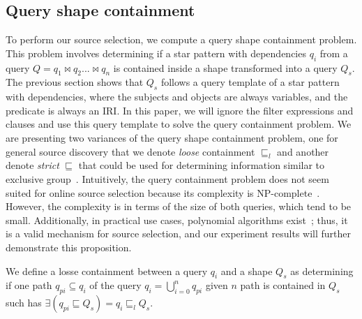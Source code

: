 \subsection{Query shape containment}

To perform our source selection, we compute a query shape containment problem. 
This problem involves determining if a star pattern with dependencies $q_i$ from a query $Q = q_1 \bowtie q_2 ... \bowtie q_n$ is contained inside a shape transformed into a query $Q_s$. 
The previous section shows that $Q_s$ follows a query template of a star pattern with dependencies, where the subjects and objects are always variables, and the predicate is always an IRI.
In this paper, we will ignore the filter expressions and clauses and use this query template to solve the query containment problem.
We are presenting two variances of the query shape containment problem, one for general source discovery that we denote \emph{loose} containment $\sqsubseteq_l$ and 
another denote \emph{strict} $\sqsubseteq$ that could be used for determining information similar to exclusive group~\cite{Schwarte2011}. 
Intuitively, the query containment problem does not seem suited for online source selection because its complexity is NP-complete~\cite{Spasi2023}.
However, the complexity is in terms of the size of both queries, which tend to be small.
Additionally, in practical use cases, polynomial algorithms exist~\cite{Doan2012}; 
thus, it is a valid mechanism for source selection, and our experiment results will further demonstrate this proposition.

\begin{definition}\label{def:looseContainment}
We define a losse containment between a query $q_i$ and a shape $Q_s$ as determining if one path $q_{pi} \subseteq q_i$ of the query $q_i = \bigcup_{i=0}^{n} q_{pi}$ given $n$ path is contained in 
$Q_s$ such has $\exists (q_{pi} \sqsubseteq  Q_s) = q_{i} \sqsubseteq_l  Q_s$.
\end{definition}

